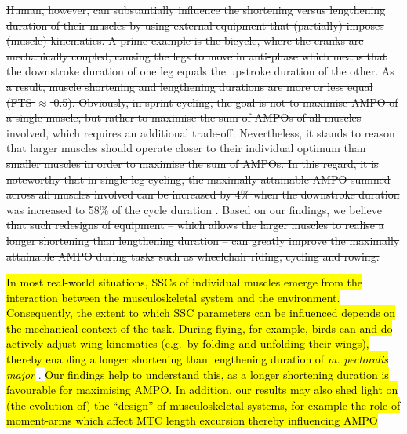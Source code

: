 \documentclass[
  10pt,
  letterpaper,
]{article}
\begin{document}
\st{Human, however, can substantially influence the shortening versus
lengthening duration of their muscles by using external equipment that
(partially) imposes (muscle) kinematics. A prime example is the bicycle,
where the cranks are mechanically coupled, causing the legs to move in
anti-phase which means that the downstroke duration of one leg equals
the upstroke duration of the other. As a result, muscle shortening and
lengthening durations are more or less equal (FTS $\approx$ 0.5).
Obviously, in sprint cycling, the goal is not to maximise AMPO of a
single muscle, but rather to maximise the sum of AMPOs of all muscles
involved, which requires an additional trade-off. Nevertheless, it
stands to reason that larger muscles should operate closer to their
individual optimum than smaller muscles in order to maximise the sum of
AMPOs. In this regard, it is noteworthy that in single-leg cycling, the
maximally attainable AMPO summed across all muscles involved can be
increased by 4\% when the downstroke duration was increased to 58\% of
the cycle duration} \citep{martin_pedal_2002}. \st{Based on our
findings, we believe that such redesigns of equipment -- which allows
the larger muscles to realise a longer shortening than lengthening
duration -- can greatly improve the maximally attainable AMPO during
tasks such as wheelchair riding, cycling and rowing.}

\hl{In most real-world situations, SSCs of individual muscles emerge
from the interaction between the musculoskeletal system and the
environment. Consequently, the extent to which SSC parameters can be
influenced depends on the mechanical context of the task. During flying,
for example, birds can and do actively adjust wing kinematics (e.g.~by
folding and unfolding their wings), thereby enabling a longer shortening
than lengthening duration of \emph{m. pectoralis major}}
\citep[e.g.,][]{askew_mechanical_2001, biewener_vivo_1998, earls_kinematics_2000, ellerby_modulation_2007, jackson_scaling_2011, spedding_wake_1987, williamson_pectoralis_2001}.
\hl{Our findings help to understand this, as a longer shortening
duration is favourable for maximising AMPO. In addition, our results may
also shed light on (the evolution of) the ``design'' of musculoskeletal
systems, for example the role of moment-arms which affect MTC length
excursion thereby influencing AMPO} \citep[e.g.][]{polet_optimal_2024}
\end{document}
